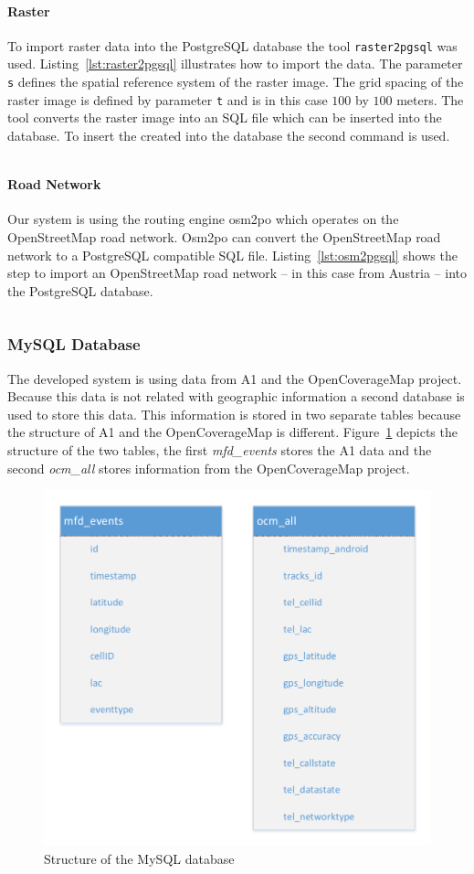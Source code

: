 \documentclass[master,english]{hgbthesis}
\begin{document}
\paragraph{Raster}
To import raster data into the PostgreSQL database the tool \verb|raster2pgsql| was used. Listing~\ref{lst:raster2pgsql} illustrates how to import the data. The parameter \verb|s| defines the spatial reference system of the raster image. The grid spacing of the raster image is defined by parameter \verb|t| and is in this case $100$ by $100$ meters. The tool converts the raster image into an SQL file which can be inserted into the database. To insert the created into the database the second command is used.
\begin{lstlisting}[style=BashInputStyle,caption={Import raster data into PostgreSQL database},label={lst:raster2pgsql}]
\end{lstlisting}
\paragraph{Road Network}
Our system is using the routing engine osm2po which operates on the OpenStreetMap road network. Osm2po can convert the OpenStreetMap road network to a PostgreSQL compatible SQL file. Listing~\ref{lst:osm2pgsql} shows the step to import an OpenStreetMap road network -- in this case from Austria -- into the PostgreSQL  database.
\begin{lstlisting}[style=BashInputStyle,caption={Import OpenStreetmap data into PostgreSQL database},label={lst:osm2pgsql}]
\end{lstlisting}
\subsubsection{MySQL Database}
The developed system is using data from A1 and the OpenCoverageMap project. Because this data is not related with geographic information a second database is used to store this data. This information is stored in two separate tables because the structure of A1 and the OpenCoverageMap is different. Figure~\ref{fig:mysql_structure} depicts the structure of the two tables, the first \emph{mfd_events} stores the A1 data and the second \emph{ocm_all} stores information from the OpenCoverageMap project.
\begin{figure}
\centering
\includegraphics[width=0.7\linewidth]{./images/mysql_structure}
\caption{Structure of the MySQL database}
\label{fig:mysql_structure}
\end{figure}
\end{document}
